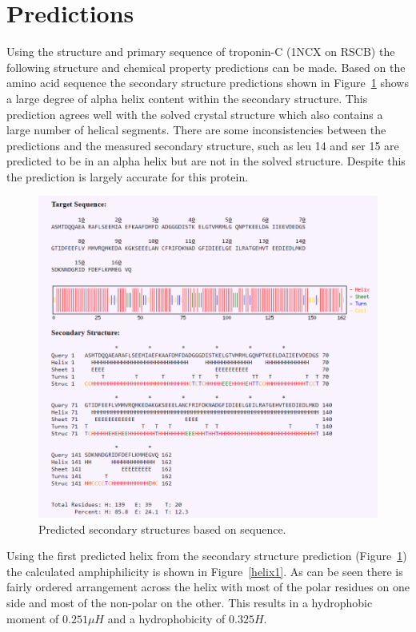 \documentclass[12pt]{article}
\begin{document}
\section{Predictions}
Using the structure and primary sequence of troponin-C (1NCX on RSCB) the following structure and chemical property predictions can be made. Based on the amino acid sequence the secondary structure predictions shown in Figure~\ref{secondStruct} shows a large degree of alpha helix content within the secondary structure. This prediction agrees well with the solved crystal structure which also contains a large number of helical segments.  There are some inconsistencies between the predictions and the measured secondary structure, such as leu 14 and ser 15 are predicted to be in an alpha helix but are not in the solved structure. Despite this the prediction is largely accurate for this protein.

\begin{figure}[H]
	\centering
	\includegraphics[width=.95\linewidth]{SecondaryStructureAnalysisPlot.png}
	
	\caption{Predicted secondary structures based on sequence.}
	\label{secondStruct}
\end{figure}

Using the first predicted helix from the secondary structure prediction (Figure~\ref{secondStruct}) the calculated amphiphilicity is shown in Figure~\ref{helix1}. As can be seen there is fairly ordered arrangement across the helix with most of the polar residues on one side and most of the non-polar on the other. This results in a hydrophobic moment of $0.251 \mu H$ and a hydrophobicity of $0.325 H$.
\end{document}
